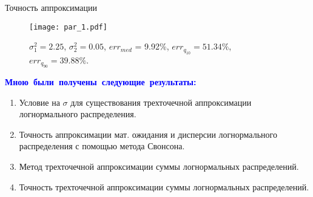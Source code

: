 \documentclass[ucs, notheorems, handout]{beamer}
\begin{document}
\begin{frame}{Точность аппроксимации }
		
	\begin{figure}[h]
		\begin{center}
			\begin{minipage}[h]{0.6\linewidth}
				\texttt{[image: par\_1.pdf]}
				\caption{$\sigma_{1}^{2} = 2.25$, $\sigma_{2}^{2} = 0.05$, $err_{med}$ = 9.92\%,  $err_{q_{10}} = 51.34\%$,  $err_{q_{90}} = 39.88\%$. } %
				\label{ris7} %
			\end{minipage}
			
		\end{center}
	\end{figure}
\end{frame}
	
\begin{frame}{}
	
	
	\textcolor{blue}{\hbox{\textbf{Мною были получены следующие результаты:}}}
	\begin{enumerate}
		\item Условие на $\sigma$ для существования трехточечной аппроксимации логнормального распределения.
		\item Точность аппроксимации мат. ожидания и дисперсии логнормального распределения с помощью метода Свонсона.
		\item Метод трехточечной аппроксимации суммы логнормальных распределений.
		\item Точность трехточечной аппроксимации суммы логнормальных распределений.
	\end{enumerate}
	
\end{frame}


	
	
\end{document}

